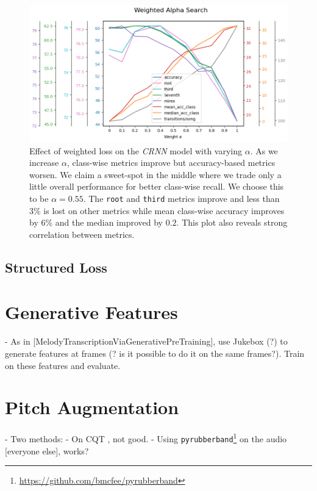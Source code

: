 \begin{figure}[H]
    \centering
    \includegraphics[width=1.0\textwidth]{figures/weight_alpha_search.png}
    \caption{Effect of weighted loss on the \emph{CRNN} model with varying $\alpha$. As we increase $\alpha$, class-wise metrics improve but accuracy-based metrics worsen. We claim a sweet-spot in the middle where we trade only a little overall performance for better class-wise recall. We choose this to be $\alpha = 0.55$. The \texttt{root} and \texttt{third} metrics improve and less than $3\%$ is lost on other metrics while mean class-wise accuracy improves by $6\%$ and the median improved by $0.2$. This plot also reveals strong correlation between metrics. }\label{fig:weighted_loss}
\end{figure}

\subsection{Structured Loss}\label{sec:structured_loss} 

\section{Generative Features}

- As in [MelodyTranscriptionViaGenerativePreTraining], use Jukebox (?) to generate features at frames (? is it possible to do it on the same frames?). Train on these features and evaluate.

\section{Pitch Augmentation}\label{sec:pitch-augmentation}
- Two methods:
- On CQT \citet{ACRLargeVocab1}, not good.
- Using \texttt{pyrubberband}\footnote{\url{https://github.com/bmcfee/pyrubberband}} on the audio [everyone else], works?

